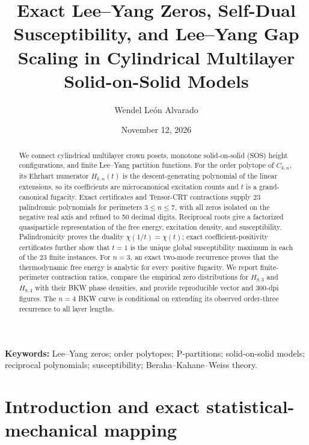 \documentclass[11pt]{article}
\title{Exact Lee--Yang Zeros, Self-Dual Susceptibility, and Lee--Yang Gap Scaling in Cylindrical Multilayer Solid-on-Solid Models}
\author{Wendel León Alvarado}
\date{November 12, 2026}
\begin{document}
\maketitle

\begin{abstract}
We connect cylindrical multilayer crown posets, monotone solid-on-solid (SOS) height configurations, and finite Lee--Yang partition functions. For the order polytope of $C_{k,n}$, its Ehrhart numerator $H_{k,n}(t)$ is the descent-generating polynomial of the linear extensions, so its coefficients are microcanonical excitation counts and $t$ is a grand-canonical fugacity. Exact certificates and Tensor-CRT contractions supply 23 palindromic polynomials for perimeters $3\le n\le7$, with all zeros isolated on the negative real axis and refined to 50 decimal digits. Reciprocal roots give a factorized quasiparticle representation of the free energy, excitation density, and susceptibility. Palindromicity proves the duality $\chi(1/t)=\chi(t)$; exact coefficient-positivity certificates further show that $t=1$ is the unique global susceptibility maximum in each of the 23 finite instances. For $n=3$, an exact two-mode recurrence proves that the thermodynamic free energy is analytic for every positive fugacity. We report finite-perimeter contraction ratios, compare the empirical zero distributions for $H_{8,3}$ and $H_{8,4}$ with their BKW phase densities, and provide reproducible vector and 300-dpi figures. The $n=4$ BKW curve is conditional on extending its observed order-three recurrence to all layer lengths.
\end{abstract}

\noindent\textbf{Keywords:} Lee--Yang zeros; order polytopes; P-partitions; solid-on-solid models; reciprocal polynomials; susceptibility; Beraha--Kahane--Weiss theory.

\section{Introduction and exact statistical-mechanical mapping}
\end{document}
